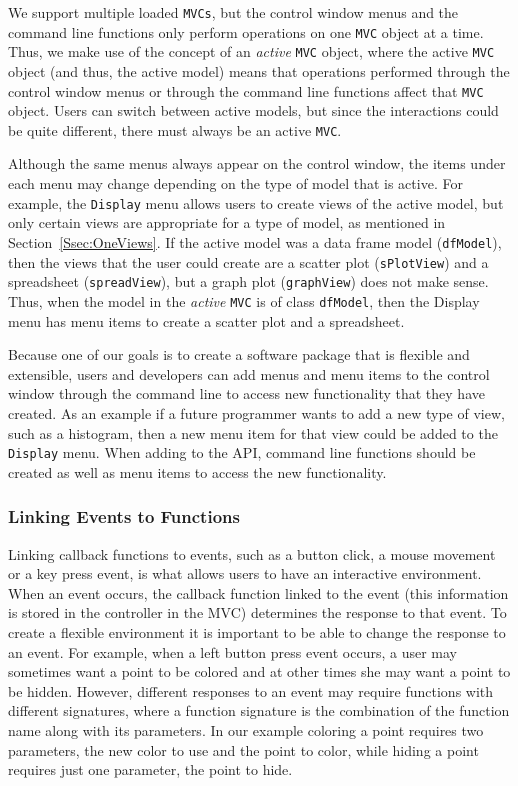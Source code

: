 \documentclass[11pt]{article}
\newcommand{\Robject}[1]{{\texttt{#1}}}
\newcommand{\Rclass}[1]{\texttt{#1}}
\begin{document}
We support multiple loaded \Robject{MVCs}, but the control window menus
and the command line functions only perform operations on one
\Robject{MVC} object at a time.  Thus, we make use of the concept of
an \textit{active} \Robject{MVC} object, where the active
\Robject{MVC} object (and thus, the active model) means that
operations performed through the control window menus or through the
command line functions affect that \Robject{MVC} object. Users can
switch between active models, but since the interactions could be
quite different, there must always be an active \Robject{MVC}. 

Although the same menus always appear on the control window,
the items under each menu may change depending on the type of model
that is active.  For example, the \texttt{Display} menu allows users
to create views of the active model, but only certain views are
appropriate for a type of model, as mentioned in
Section~\ref{Ssec:OneViews}.  If the active model was a data frame
model (\Rclass{dfModel}), then the views that the user could create
are a scatter plot (\Rclass{sPlotView}) and a spreadsheet
(\Rclass{spreadView}), but a graph plot (\Rclass{graphView}) does not
make sense.  Thus, when the model in the \textit{active} \Robject{MVC} is
of class \Rclass{dfModel}, then the Display menu has menu items to
create a scatter plot and a spreadsheet.

Because one of our goals is to create a software package that is
flexible and extensible, users and developers can add menus and menu items 
to the control window through the command line to access new
functionality that they have created.  As an example if a future
programmer wants to add a new type of view, such as a histogram, then
a new menu item for that view could be added to the \texttt{Display}
menu.  When adding to the API, command line functions should be created as
well as menu items to access the new functionality.

\subsubsection{Linking Events to Functions}
\label{Ssec:OneEvent}

Linking callback functions to events, such as a button click, a mouse
movement or a key press event, is what allows users to have an
interactive environment.  When an event occurs, the callback function linked
to the event (this information is stored in the controller in the MVC)
determines the response to that event.  To create
a flexible environment it is important to be able to change the
response to an event.  For example, when a left button press event
occurs, a user may sometimes want a point to be colored and at other
times she may want a point to be hidden.  However, different responses
to an event may require functions with different signatures, where a function
signature is the combination of the function name along with its parameters.
In our example coloring a point requires two parameters, the new color to use
and the point to color, while hiding a point requires just one parameter, the
point to hide.  
\end{document}
